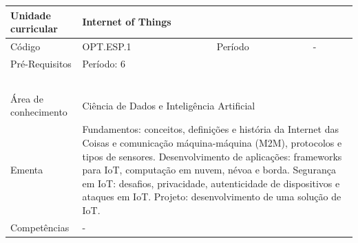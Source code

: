 \clearpage
\newpage

\begin{quadro}[ht!]
  \centering\scriptsize
\caption{Unidade Curricular Internet of Things}

\begin{tabular}{|p{2.5cm}|p{2.5cm}|p{2.5cm}|p{2.5cm}|p{2.5cm}|}\hline

  Unidade curricular & \multicolumn{4}{p{10cm}|}{ Internet of Things }\\\hline
  Código & OPT.ESP.1 & Período & \multicolumn{2}{p{5cm}|}{ - }\\\hline
  Pré-Requisitos & \multicolumn{4}{p{10cm}|}{ Período: 6 } \\\hline
  \cellcolor{blue1}{ CH PRESENCIAL } &
    \cellcolor{blue1}{CH EAD Síncrona} &
    \cellcolor{blue1}{CH EAD Síncrona Mediada} &
    \cellcolor{blue1}{CH EAD Assíncrona} &
    \cellcolor{blue1}{CH APCC} \\\hline
  \cellcolor{blue1}{ 60 } &
    \cellcolor{blue1}{ 0 } &
    \cellcolor{blue1}{ 30 } &
    \cellcolor{blue1}{ 30 } &
    \cellcolor{blue1}{0} \\\hline
  \cellcolor{blue1}{ CH Teórica } &
    \cellcolor{blue1}{CH Prática} &
    \cellcolor{blue1}{CH Humanidades} &
    \cellcolor{blue1}{CH Extensão} &
    \cellcolor{blue1}{CH EAD TOTAL} \\\hline
  \cellcolor{blue1}{ 30 } &
    \cellcolor{blue1}{ 30 } &
    \cellcolor{blue1}{ 0 } &
    \cellcolor{blue1}{ 0 } &
    \cellcolor{blue1}{ 60 } \\\hline
  \cellcolor{blue1}{CARGA-HORÁRIA TOTAL} & \multicolumn{4}{p{10cm}|}{ \cellcolor{blue1}{ 60 } } \\\hline
  Área de conhecimento & \multicolumn{4}{p{10cm}|}{ Ciência de Dados e Inteligência Artificial } \\\hline
  Ementa & \multicolumn{4}{p{10cm}|}{ Fundamentos: conceitos, definições e história da Internet das Coisas e comunicação máquina-máquina (M2M), protocolos e tipos de sensores. Desenvolvimento de aplicações: frameworks para IoT, computação em nuvem, névoa e borda. Segurança em IoT: desafios, privacidade, autenticidade de dispositivos e ataques em IoT. Projeto: desenvolvimento de uma solução de IoT. } \\\hline
  Competências & \multicolumn{4}{p{10cm}|}{ - } \\\hline


  
	\end{tabular}

\end{quadro}


